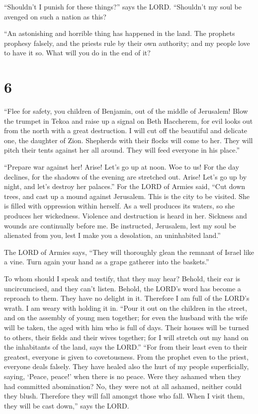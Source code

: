  ``Shouldn't I punish for these things?'' says the LORD.
``Shouldn't my soul be avenged on such a nation as this?

 ``An astonishing and horrible thing has happened in the
land.  The prophets prophesy falsely, and the priests
rule by their own authority; and my people love to have it so. What will
you do in the end of it?

\hypertarget{section-5}{%
\section{6}\label{section-5}}

 ``Flee for safety, you children of Benjamin, out of the
middle of Jerusalem! Blow the trumpet in Tekoa and raise up a signal on
Beth Haccherem, for evil looks out from the north with a great
destruction.  I will cut off the beautiful and delicate
one, the daughter of Zion.  Shepherds with their flocks
will come to her. They will pitch their tents against her all around.
They will feed everyone in his place.''

 ``Prepare war against her! Arise! Let's go up at noon.
Woe to us! For the day declines, for the shadows of the evening are
stretched out.  Arise! Let's go up by night, and let's
destroy her palaces.''  For the LORD of Armies said, ``Cut
down trees, and cast up a mound against Jerusalem. This is the city to
be visited. She is filled with oppression within herself. 
As a well produces its waters, so she produces her wickedness. Violence
and destruction is heard in her. Sickness and wounds are continually
before me.  Be instructed, Jerusalem, lest my soul be
alienated from you, lest I make you a desolation, an uninhabited land.''

 The LORD of Armies says, ``They will thoroughly glean the
remnant of Israel like a vine. Turn again your hand as a grape gatherer
into the baskets.''

 To whom should I speak and testify, that they may hear?
Behold, their ear is uncircumcised, and they can't listen. Behold, the
LORD's word has become a reproach to them. They have no delight in it.
 Therefore I am full of the LORD's wrath. I am weary with
holding it in. ``Pour it out on the children in the street, and on the
assembly of young men together; for even the husband with the wife will
be taken, the aged with him who is full of days.  Their
houses will be turned to others, their fields and their wives together;
for I will stretch out my hand on the inhabitants of the land, says the
LORD.''  ``For from their least even to their greatest,
everyone is given to covetousness. From the prophet even to the priest,
everyone deals falsely.  They have healed also the hurt
of my people superficially, saying, `Peace, peace!' when there is no
peace.  Were they ashamed when they had committed
abomination? No, they were not at all ashamed, neither could they blush.
Therefore they will fall amongst those who fall. When I visit them, they
will be cast down,'' says the LORD.

